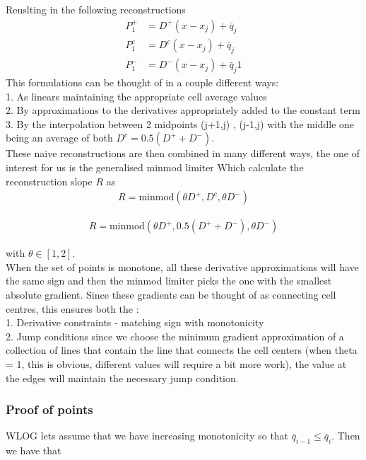 \documentclass[10pt]{article}
\begin{document}
Reuslting in the following reconstructions
\begin{align}
P_1^+ &= D^+ \left(x - x_j\right) + \bar{q}_{j} \\
P_1^c &= D^c \left(x - x_j\right) + \bar{q}_{j} \\
P_1^- &=D^- \left(x - x_j\right) + \bar{q}_{j}1
\end{align}
This formulations can be thought of in a couple different ways: \\
1. As linears maintaining the appropriate cell average values \\ 
2. By approximations to the derivatives appropriately added to the constant term \\
3. By the interpolation between 2 midpoints (j+1,j) , (j-1,j) with the middle one being an average of both $D^c = 0.5\left(D^+ + D^-\right)$. \\

These naive reconstructions are then combined in many different ways, the one of interest for us is the generalised minmod limiter
Which calculate the reconstruction slope $R$ as
\begin{align}
R = \text{minmod}\left( \theta D^+,D^c,\theta D^-\right)
\end{align}

\begin{align}
R = \text{minmod}\left( \theta D^+,0.5\left(D^+ + D^-\right),\theta D^-\right)
\end{align}

with $\theta \in \left[1,2\right]$. \\

When the set of points is monotone, all these derivative approximations will have the same sign and then the minmod limiter picks the one with the smallest absolute gradient. Since these gradients can be thought of as connecting cell centres, this ensures both the : \\

1. Derivative constraints - matching sign with monotonicity \\
2. Jump conditions since we choose the minimum gradient approximation of a collection of lines that contain the line that connects the cell centers (when theta = 1, this is obvious, different values will require a bit more work), the value at the edges will maintain the necessary jump condition.

\subsubsection{Proof of points }
WLOG lets assume that we have increasing monotonicity so that $\bar{q}_{i-1} \le \bar{q}_{i}$. Then we have that
\end{document}
